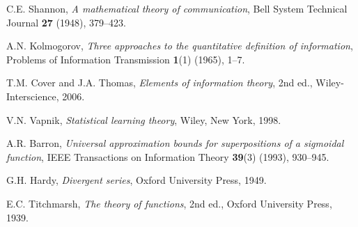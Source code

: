 \documentclass[11pt]{article}
\theoremstyle{definition}
\begin{document}
\begin{thebibliography}{99}

 C.E. Shannon, \emph{A mathematical theory of communication}, Bell System Technical Journal \textbf{27} (1948), 379--423.

 A.N. Kolmogorov, \emph{Three approaches to the quantitative definition of information}, Problems of Information Transmission \textbf{1}(1) (1965), 1--7.

 T.M. Cover and J.A. Thomas, \emph{Elements of information theory}, 2nd ed., Wiley-Interscience, 2006.

 V.N. Vapnik, \emph{Statistical learning theory}, Wiley, New York, 1998.

 A.R. Barron, \emph{Universal approximation bounds for superpositions of a sigmoidal function}, IEEE Transactions on Information Theory \textbf{39}(3) (1993), 930--945.

 G.H. Hardy, \emph{Divergent series}, Oxford University Press, 1949.

 E.C. Titchmarsh, \emph{The theory of functions}, 2nd ed., Oxford University Press, 1939.

\end{thebibliography}
\end{document}
